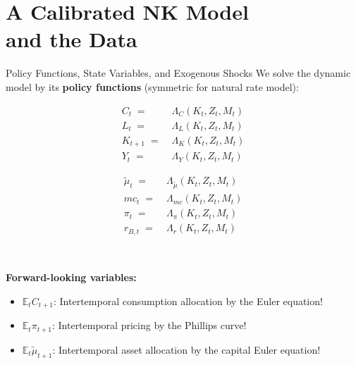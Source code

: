 \documentclass[10pt,c,aspectratio=1610,handout]{beamer}
\begin{document}
\section{A Calibrated NK Model\\and the Data}%
\begin{frame}{Policy Functions, State Variables, and Exogenous Shocks}%
  \small%
  We solve the dynamic model by its \textbf{policy functions} (symmetric for natural rate model):\\%
  \begin{footnotesize}%
  \begin{minipage}{0.5\textwidth}%
    \begin{align*}%
      C_t \; = & \; \Lambda_C \left(K_t, Z_t, M_t\right)\\%
      L_t \; = & \; \Lambda_L \left(K_t, Z_t, M_t\right)\\%
      K_{t+1} \; = & \; \Lambda_K \left(K_t, Z_t, M_t\right)\\%
      Y_t \; = & \; \Lambda_Y \left(K_t, Z_t, M_t\right)%
    \end{align*}%
  \end{minipage}%
  \hfill%
  \begin{minipage}{0.5\textwidth}%
    \begin{align*}%
      \tilde{\mu}_t \; = & \; \Lambda_{\tilde{\mu}} \left(K_t, Z_t, M_t\right)\\%
      mc_t \; = & \; \Lambda_{mc} \left(K_t, Z_t, M_t\right)\\%
      \pi_t \; = & \; \Lambda_{\pi} \left(K_t, Z_t, M_t\right)\\%
      r_{B,t} \; = & \; \Lambda_r \left(K_t, Z_t, M_t\right)%
    \end{align*}%
  \end{minipage}\\%
  \end{footnotesize}%
  \vspace*{0.2in}%
  \pause%
  \textbf{Forward-looking variables:}%
  \begin{itemize}%
    \item[$\blacktriangleright$] $\mathbb{E}_t C_{t+1}$: Intertemporal consumption allocation by the Euler equation!%
    \item[$\blacktriangleright$] $\mathbb{E}_t \pi_{t+1}$: Intertemporal pricing by the Phillips curve!
    \item[$\blacktriangleright$] $\mathbb{E}_t \tilde{\mu}_{t+1}$: Intertemporal asset allocation by the capital Euler equation!%

\end{itemize}
\end{frame}
\end{document}
